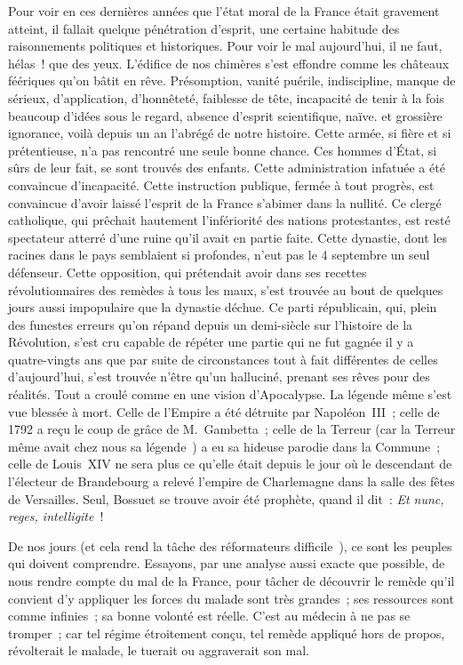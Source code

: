 \documentclass[french,twoside]{book} %
\begin{document}
Pour voir en ces dernières années que l’état moral de la France était gravement atteint, il fallait quelque pénétration d’esprit, une certaine habitude des raisonnements politiques et historiques. Pour voir le mal aujourd’hui, il ne faut, hélas ! que des yeux. L’édifice de nos chimères s’est effondre comme les châteaux féériques qu’on bâtit en rêve. Présomption, vanité puérile, indiscipline, manque de sérieux, d’application, d’honnêteté, faiblesse de tête, incapacité de tenir à la fois beaucoup d’idées sous le regard, absence d’esprit scientifique, naïve. et grossière ignorance, voilà depuis un an l’abrégé de notre histoire. Cette armée, si fière et si prétentieuse, n’a pas rencontré une seule bonne chance. Ces hommes d’État, si sûrs de leur fait, se sont trouvés des enfants. Cette administration infatuée a été convaincue d’incapacité. Cette instruction publique, fermée à tout progrès, est convaincue d’avoir laissé l’esprit de la France s’abimer dans la nullité. Ce clergé catholique, qui prêchait hautement l’infériorité des nations protestantes, est resté spectateur atterré d’une ruine qu’il avait en partie faite. Cette dynastie, dont les racines dans le pays semblaient si profondes, n’eut pas le 4 septembre un seul défenseur. Cette opposition, qui prétendait avoir dans ses recettes révolutionnaires des remèdes à tous les maux, s’est trouvée au bout de quelques jours aussi impopulaire que la dynastie déchue. Ce parti républicain, qui, plein des funestes erreurs qu’on répand depuis un demi-siècle sur l’histoire de la Révolution, s’est cru capable de répéter une partie qui ne fut gagnée il y a quatre-vingts ans que par suite de circonstances tout à fait différentes de celles d’aujourd’hui, s’est trouvée n’être qu’un halluciné, prenant ses rêves pour des réalités. Tout a croulé comme en une vision d’Apocalypse. La légende même s’est vue blessée à mort. Celle de l’Empire a été détruite par Napoléon III ; celle de 1792 a reçu le coup de grâce de M. Gambetta ; celle de la Terreur (car la Terreur même avait chez nous sa légende ) a eu sa hideuse parodie dans la Commune ; celle de Louis XIV ne sera plus ce qu’elle était depuis le jour où le descendant de l’électeur de Brandebourg a relevé l’empire de Charlemagne dans la salle des fêtes de Versailles. Seul, Bossuet se trouve avoir été prophète, quand il dit : {\itshape Et nunc, reges, intelligite} ! \par
De nos jours (et cela rend la tâche des réformateurs difficile ), ce sont les peuples qui doivent comprendre. Essayons, par une analyse aussi exacte que possible, de nous rendre compte du mal de la France, pour tâcher de découvrir le remède qu’il convient d’y appliquer les forces du malade sont très grandes ; ses ressources sont comme infinies ; sa bonne volonté est réelle. C’est au médecin à ne pas se tromper ; car tel régime étroitement conçu, tel remède appliqué hors de propos, révolterait le malade, le tuerait ou aggraverait son mal.\par
\par
\end{document}
